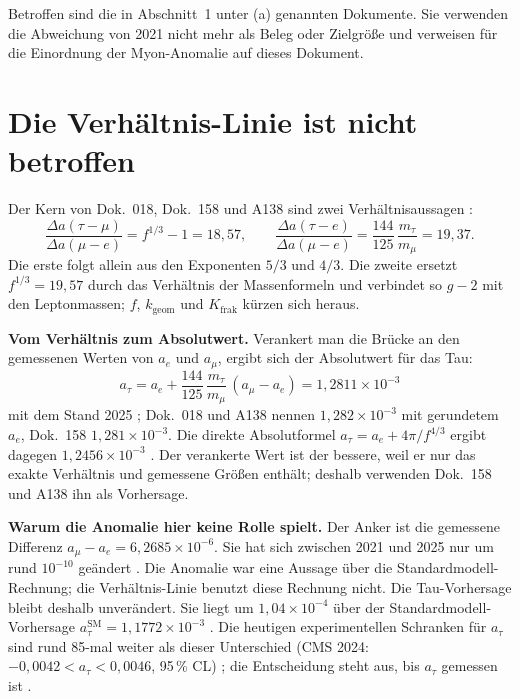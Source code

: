 Betroffen sind die in Abschnitt~1 unter (a) genannten Dokumente. Sie verwenden die
Abweichung von 2021 nicht mehr als Beleg oder Zielgröße und verweisen für die
Einordnung der Myon-Anomalie auf dieses Dokument.

\section{Die Verhältnis-Linie ist nicht betroffen}
Der Kern von Dok.~018, Dok.~158 und A138 sind zwei Verhältnisaussagen \KM:
\[
  \frac{\Delta a(\tau{-}\mu)}{\Delta a(\mu{-}e)} = f^{1/3}-1 = 18{,}57,
  \qquad
  \frac{\Delta a(\tau{-}e)}{\Delta a(\mu{-}e)} = \frac{144}{125}\,\frac{m_\tau}{m_\mu} = 19{,}37 .
\]
Die erste folgt allein aus den Exponenten $5/3$ und $4/3$. Die zweite ersetzt
$f^{1/3}=19{,}57$ durch das Verhältnis der Massenformeln und verbindet so $g-2$ mit
den Leptonmassen; $f$, $k_\mathrm{geom}$ und $K_\mathrm{frak}$ kürzen sich heraus.

\textbf{Vom Verhältnis zum Absolutwert.} Verankert man die Brücke an den gemessenen
Werten von $a_e$ und $a_\mu$, ergibt sich der Absolutwert für das Tau:
\[
  a_\tau = a_e + \frac{144}{125}\,\frac{m_\tau}{m_\mu}\,(a_\mu-a_e) = 1{,}2811\times10^{-3}
\]
mit dem Stand 2025 \KM; Dok.~018 und A138 nennen $1{,}282\times10^{-3}$ mit gerundetem
$a_e$, Dok.~158 $1{,}281\times10^{-3}$. Die direkte Absolutformel
$a_\tau=a_e+4\pi/f^{4/3}$ ergibt dagegen $1{,}2456\times10^{-3}$ \KM. Der verankerte
Wert ist der bessere, weil er nur das exakte Verhältnis und gemessene Größen enthält;
deshalb verwenden Dok.~158 und A138 ihn als Vorhersage.

\textbf{Warum die Anomalie hier keine Rolle spielt.} Der Anker ist die gemessene
Differenz $a_\mu-a_e=6{,}2685\times10^{-6}$. Sie hat sich zwischen 2021 und 2025 nur um
rund $10^{-10}$ geändert \KM. Die Anomalie war eine Aussage über die
Standardmodell-Rechnung; die Verhältnis-Linie benutzt diese Rechnung nicht. Die
Tau-Vorhersage bleibt deshalb unverändert. Sie liegt um $1{,}04\times10^{-4}$ über der
Standardmodell-Vorhersage $a_\tau^{\mathrm{SM}}=1{,}1772\times10^{-3}$ \KM. Die
heutigen experimentellen Schranken für $a_\tau$ sind rund 85-mal weiter als dieser
Unterschied (CMS 2024: $-0{,}0042 < a_\tau < 0{,}0046$, 95\,\% CL) \KM; die Entscheidung steht aus, bis $a_\tau$ gemessen ist \SM.

